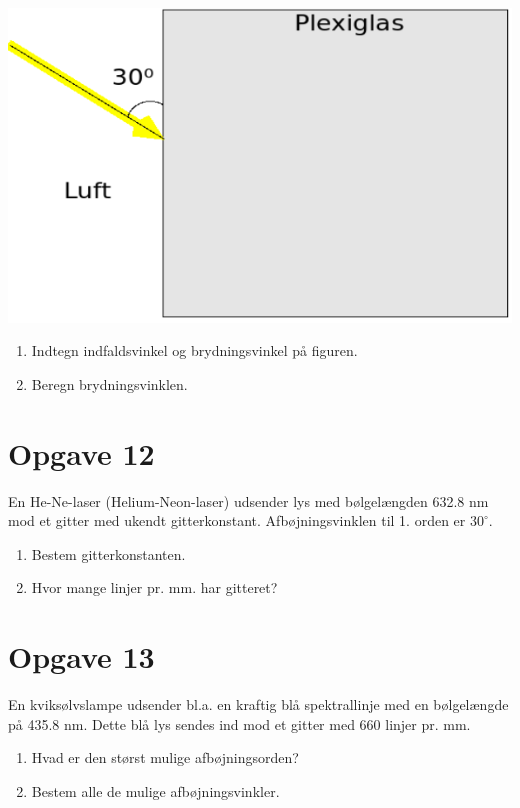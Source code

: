 \documentclass[a4paper, 12pt]{article}
\begin{document}
\begin{center}
\includegraphics[width=.9\linewidth]{./img/Plexiglas.png}
\end{center}

\begin{enumerate}
\item Indtegn indfaldsvinkel og brydningsvinkel på figuren.

\item Beregn brydningsvinklen.
\end{enumerate}

\section*{Opgave 12}
\label{sec:org343ea4b}

En He-Ne-laser (Helium-Neon-laser) udsender lys med bølgelængden 632.8 nm mod et gitter med ukendt gitterkonstant.
Afbøjningsvinklen til 1. orden er \(30^\circ\).

\begin{enumerate}
\item Bestem gitterkonstanten.

\item Hvor mange linjer pr. mm. har gitteret?
\end{enumerate}

\section*{Opgave 13}
\label{sec:orgab90255}

En kviksølvslampe udsender bl.a. en kraftig blå spektrallinje med en bølgelængde på 435.8 nm. Dette blå lys sendes ind mod et gitter med 660 linjer pr. mm. 

\begin{enumerate}
\item Hvad er den størst mulige afbøjningsorden?

\item Bestem alle de mulige afbøjningsvinkler.
\end{enumerate}
\end{document}
